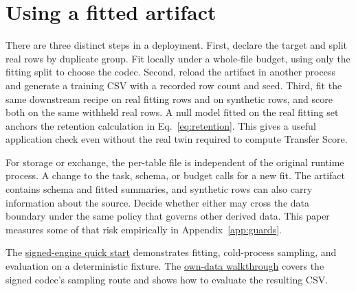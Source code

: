 \section{Using a fitted artifact}\label{sec:practical}

There are three distinct steps in a deployment. First, declare the target and split real rows by duplicate group. Fit locally under a whole-file budget, using only the fitting split to choose the codec. Second, reload the artifact in another process and generate a training CSV with a recorded row count and seed. Third, fit the same downstream recipe on real fitting rows and on synthetic rows, and score both on the same withheld real rows. A null model fitted on the real fitting set anchors the retention calculation in Eq.~\eqref{eq:retention}. This gives a useful application check even without the real twin required to compute Transfer Score.

For storage or exchange, the per-table file is independent of the original runtime process. A change to the task, schema, or budget calls for a new fit. The artifact contains schema and fitted summaries, and synthetic rows can also carry information about the source. Decide whether either may cross the data boundary under the same policy that governs other derived data. This paper measures some of that risk empirically in Appendix~\ref{app:guards}.

The \href{https://github.com/neverhuman/dope#quick-start}{signed-engine quick start} demonstrates fitting, cold-process sampling, and evaluation on a deterministic fixture. The \href{https://github.com/neverhuman/dope/blob/main/docs/getting-started.md}{own-data walkthrough} covers the signed codec's sampling route and shows how to evaluate the resulting CSV.
